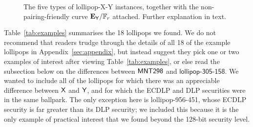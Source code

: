 \documentclass[version=preprint]{iacrcc}
\newcommand{\F}{\mathbb{F}}
\begin{document}
\begin{figure}[ht!]
{{	}}
	\caption{The five types of \textsf{lollipop-X-Y} instances, together with the non-pairing-friendly curve $\mathbf{E}_{{\sf Y}}/\F_r$ attached. Further explanation in text. 
}
	\label{fig:types}
\end{figure}

Table~\ref{tab:examples} summarises the 18 lollipops we found. We do not recommend that readers trudge through the details of all 18 of the example lollipops in Appendix~\ref{sec:appendix}, but instead suggest they pick one or two examples of interest after viewing Table~\ref{tab:examples}, or else read the subsection below on the differences between ${\sf MNT298}$ and $\textsf{lollipop-305-158}$. We wanted to include all of the lollipops for which there was an appreciable difference between ${\sf X}$ and ${\sf Y}$, and for which the ECDLP and DLP securities were in the same ballpark. The only exception here is \textsf{lollipop-956-451}, whose ECDLP security is far greater than its DLP security; we included this because it is the only example of practical interest that we found beyond the 128-bit security level. 
\end{document}
